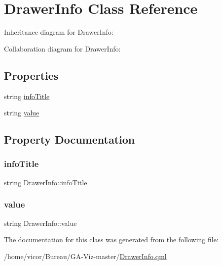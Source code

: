 \hypertarget{class_drawer_info}{}\section{Drawer\+Info Class Reference}
\label{class_drawer_info}


Inheritance diagram for Drawer\+Info\+:


Collaboration diagram for Drawer\+Info\+:
\subsection*{Properties}
\begin{DoxyCompactItemize}
\item 
string \hyperlink{class_drawer_info_a47107ce66d0bc6196fb16dc66c48aad7}{info\+Title}
\item 
string \hyperlink{class_drawer_info_adc42d19634c2b16b60312deec71e1bbc}{value}
\end{DoxyCompactItemize}


\subsection{Property Documentation}
\mbox{\label{class_drawer_info_a47107ce66d0bc6196fb16dc66c48aad7}} 
\subsubsection{\texorpdfstring{info\+Title}{infoTitle}}
{\footnotesize\ttfamily string Drawer\+Info\+::info\+Title}

\mbox{\label{class_drawer_info_adc42d19634c2b16b60312deec71e1bbc}} 
\subsubsection{\texorpdfstring{value}{value}}
{\footnotesize\ttfamily string Drawer\+Info\+::value}



The documentation for this class was generated from the following file\+:\begin{DoxyCompactItemize}
\item 
/home/vicor/\+Bureau/\+G\+A-\/\+Viz-\/master/\hyperlink{_drawer_info_8qml}{Drawer\+Info.\+qml}\end{DoxyCompactItemize}
